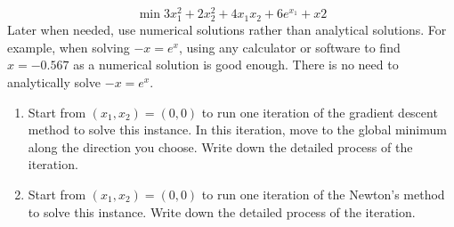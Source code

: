 \documentclass[12pt]{article}
\begin{document}
\begin{enumerate}
\begin{equation*}
                  \min 3x_1^2 + 2x_2^2 + 4x_1x_2 +6e^{x_1}+x2
            \end{equation*}
            Later when needed, use numerical solutions rather than analytical solutions. For example, when solving $-x = e^x$, using any calculator or software to find $x = -0.567$ as a numerical solution is good enough. There is no need to analytically solve $-x = e^x$.
            \begin{enumerate}
                  \item Start from $(x_1,x_2) = (0,0)$ to run one iteration of the gradient descent method to solve this instance. In this iteration, move to the global minimum along the direction you choose. Write down the detailed process of the iteration.
                  \item Start from $(x_1, x_2) = (0, 0)$ to run one iteration of the Newton’s method to solve this instance. Write down the detailed process of the iteration.
            \end{enumerate}
\end{enumerate}
\end{document}
